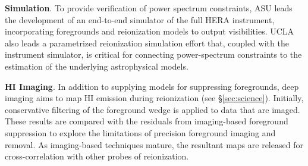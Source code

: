 \documentclass[preprint]{aastex}
\newcommand{\compress}{\vspace{-0.25in}}
\begin{document}
{\bf Simulation}. To provide verification of power spectrum constraints, ASU leads the
development of an end-to-end simulator of the full HERA instrument, incorporating
foregrounds and reionization models to output visibilities.  UCLA also leads
a parametrized reionization simulation effort that, coupled with the instrument
simulator, is critical for connecting power-spectrum constraints to the estimation
of the underlying astrophysical models.


{\bf HI Imaging}. In addition to supplying models for suppressing foregrounds,
deep imaging aims to map HI emission during reionization (see \S\ref{sec:science}).
Initially, conservative filtering of the foreground wedge is applied to data that
are imaged.  These results are compared with the residuals from imaging-based
foreground suppression to explore the limitations of 
precision foreground imaging and removal.  As imaging-based techniques mature, the resultant
maps are released for cross-correlation with other probes of reionization.

%


\end{document}
